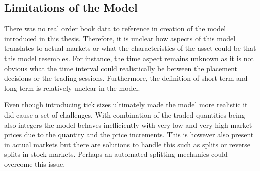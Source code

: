 \subsection{Limitations of the Model}


There was no real order book data to reference in creation of the model
introduced in this thesis. Therefore, it is unclear how aspects of this
model translates to actual markets or what the characteristics of the 
asset could be that this model resembles. For instance, the time aspect
remains unknown as it is not obvious what the time interval could
realistically be between the placement decisions or the trading 
sessions. Furthermore, the definition of short-term and long-term is
relatively unclear in the model.

Even though introducing
tick sizes ultimately made the model more realistic it did cause a 
set of challenges. With combination of the traded quantities being
also integers the model behaves inefficiently with very low and very
high market prices due to the quantity and the price increments. This
is however also present in actual markets but there are solutions to handle
this such as splits or reverse splits in stock markets. Perhaps an
automated splitting mechanics could overcome this issue.

